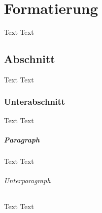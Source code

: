 \chapter{Formatierung}
Text Text

\section{Abschnitt}
Text Text

\subsection{Unterabschnitt}
Text Text

\paragraph{Paragraph}
Text Text

\subparagraph{Unterparagraph}
Text Text